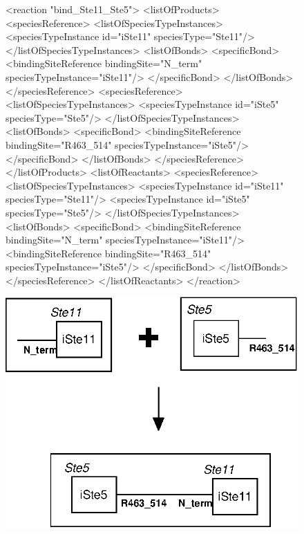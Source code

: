 \documentclass{cekarticle}
\begin{document}
\begin{figure}[h]
\begin{example}
<reaction "bind_Ste11_Ste5">
    <listOfProducts>
        <speciesReference>
            <listOfSpeciesTypeInstances>
                <speciesTypeInstance id="iSte11" speciesType="Ste11"/>
            </listOfSpeciesTypeInstances>
            <listOfBonds>
                <specificBond>
                    <bindingSiteReference bindingSite="N_term" speciesTypeInstance="iSte11"/>
                </specificBond>
            </listOfBonds>
        </speciesReference>
        <speciesReference>
            <listOfSpeciesTypeInstances>
                <speciesTypeInstance id="iSte5" speciesType="Ste5"/>
            </listOfSpeciesTypeInstances>
            <listOfBonds>
                <specificBond>
                    <bindingSiteReference bindingSite="R463_514" speciesTypeInstance="iSte5"/>
                </specificBond>
            </listOfBonds>
        </speciesReference>
    </listOfProducts>
    <listOfReactants>
        <speciesReference>
            <listOfSpeciesTypeInstances>
                <speciesTypeInstance id="iSte11" speciesType="Ste11"/>
                <speciesTypeInstance id="iSte5" speciesType="Ste5"/>
            </listOfSpeciesTypeInstances>
            <listOfBonds>
                <specificBond>
                    <bindingSiteReference bindingSite="N_term" speciesTypeInstance="iSte11"/>
                    <bindingSiteReference bindingSite="R463_514" speciesTypeInstance="iSte5"/>
                </specificBond>
            </listOfBonds>
        </speciesReference>
    </listOfReactants>
</reaction>
\end{example}
  \vspace*{8pt}
  \centering
  \includegraphics[scale = 0.7]{bind_Ste11_Ste5_v2.eps}
  

\end{figure}
\end{document}
